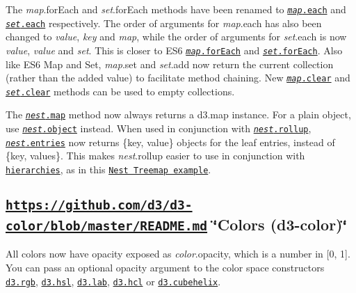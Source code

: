 The {\itshape map}.for\+Each and {\itshape set}.for\+Each methods have been renamed to \href{https://github.com/d3/d3-collection/blob/master/README.md#map_each}{\tt {\itshape map}.each} and \href{https://github.com/d3/d3-collection/blob/master/README.md#set_each}{\tt {\itshape set}.each} respectively. The order of arguments for {\itshape map}.each has also been changed to {\itshape value}, {\itshape key} and {\itshape map}, while the order of arguments for {\itshape set}.each is now {\itshape value}, {\itshape value} and {\itshape set}. This is closer to E\+S6 \href{https://developer.mozilla.org/en-US/docs/Web/JavaScript/Reference/Global_Objects/Map/forEach}{\tt {\itshape map}.for\+Each} and \href{https://developer.mozilla.org/en-US/docs/Web/JavaScript/Reference/Global_Objects/Set/forEach}{\tt {\itshape set}.for\+Each}. Also like E\+S6 Map and Set, {\itshape map}.set and {\itshape set}.add now return the current collection (rather than the added value) to facilitate method chaining. New \href{https://github.com/d3/d3-collection/blob/master/README.md#map_clear}{\tt {\itshape map}.clear} and \href{https://github.com/d3/d3-collection/blob/master/README.md#set_clear}{\tt {\itshape set}.clear} methods can be used to empty collections.

The \href{https://github.com/d3/d3-collection/blob/master/README.md#nest_map}{\tt {\itshape nest}.map} method now always returns a d3.\+map instance. For a plain object, use \href{https://github.com/d3/d3-collection/blob/master/README.md#nest_object}{\tt {\itshape nest}.object} instead. When used in conjunction with \href{https://github.com/d3/d3-collection/blob/master/README.md#nest_rollup}{\tt {\itshape nest}.rollup}, \href{https://github.com/d3/d3-collection/blob/master/README.md#nest_entries}{\tt {\itshape nest}.entries} now returns \{key, value\} objects for the leaf entries, instead of \{key, values\}. This makes {\itshape nest}.rollup easier to use in conjunction with \href{#hierarchies-d3-hierarchy}{\tt hierarchies}, as in this \href{https://bl.ocks.org/mbostock/2838bf53e0e65f369f476afd653663a2}{\tt Nest Treemap example}.

\subsection*{\href{https://github.com/d3/d3-color/blob/master/README.md}{\tt https\+://github.\+com/d3/d3-\/color/blob/master/\+R\+E\+A\+D\+M\+E.\+md} \char`\"{}\+Colors (d3-\/color)\char`\"{}}

All colors now have opacity exposed as {\itshape color}.opacity, which is a number in \mbox{[}0, 1\mbox{]}. You can pass an optional opacity argument to the color space constructors \href{https://github.com/d3/d3-color/blob/master/README.md#rgb}{\tt d3.\+rgb}, \href{https://github.com/d3/d3-color/blob/master/README.md#hsl}{\tt d3.\+hsl}, \href{https://github.com/d3/d3-color/blob/master/README.md#lab}{\tt d3.\+lab}, \href{https://github.com/d3/d3-color/blob/master/README.md#hcl}{\tt d3.\+hcl} or \href{https://github.com/d3/d3-color/blob/master/README.md#cubehelix}{\tt d3.\+cubehelix}.

